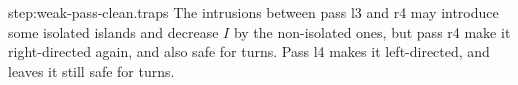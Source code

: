 \documentclass[11pt]{memoir}
\theoremstyle{definition} %
\renewcommand{\ge}{\geq}
\def\B{B}
\newcommand{\E}{E} %
\newcommand{\F}{F}
\newcommand{\s}{s} %
\newcommand{\Z}{Z} %
\begin{document}
\begin{Proof}
\begin{step+}{step:weak-pass-clean.traps}
  The intrusions between pass l3 and r4 may introduce some isolated islands and decrease
  \( I \) by the non-isolated ones, but pass r4 make it right-directed again, and also safe for turns.
  Pass l4 makes it left-directed, and leaves it still safe for turns.
\end{step+}


  

\end{Proof}
\end{document}
